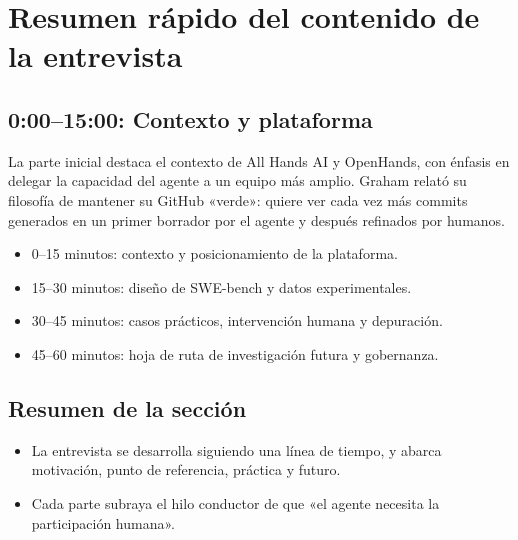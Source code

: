 \section{Resumen rápido del contenido de la entrevista}
\subsection{0:00--15:00: Contexto y plataforma}
La parte inicial destaca el contexto de All Hands AI y OpenHands, con énfasis en delegar la capacidad del agente a un equipo más amplio. Graham relató su filosofía de mantener su GitHub «verde»: quiere ver cada vez más commits generados en un primer borrador por el agente y después refinados por humanos.

\begin{itemize}
    \item 0--15 minutos: contexto y posicionamiento de la plataforma.
    \item 15--30 minutos: diseño de SWE-bench y datos experimentales.
    \item 30--45 minutos: casos prácticos, intervención humana y depuración.
    \item 45--60 minutos: hoja de ruta de investigación futura y gobernanza.
\end{itemize}

\subsection{Resumen de la sección}
\begin{itemize}
    \item La entrevista se desarrolla siguiendo una línea de tiempo, y abarca motivación, punto de referencia, práctica y futuro.
    \item Cada parte subraya el hilo conductor de que «el agente necesita la participación humana».
\end{itemize}

